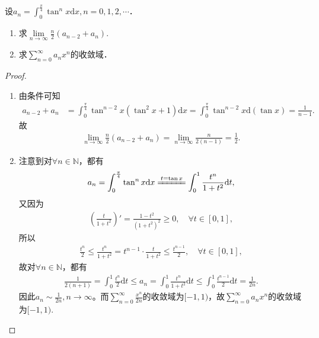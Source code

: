 \documentclass[../../main.tex]{subfiles}
\begin{document}
\begin{example}
设$a_n = \int_0^{\frac{\pi}{4}} \tan^n x \mathrm{d}x, n = 0,1,2,\cdots$．
\begin{enumerate}[(1)]
\item 求$\lim\limits_{n \to \infty} \frac{n}{2}(a_{n-2} + a_n).$

\item 求$\sum\limits_{n=0}^{\infty} a_n x^n$的收敛域．
\end{enumerate}
\end{example}
\begin{proof}
\begin{enumerate}[(1)]
\item 由条件可知
\begin{align*}
a_{n-2} + a_n &= \int_0^{\frac{\pi}{4}} \tan^{n-2}x \left( \tan^2 x + 1 \right) \mathrm{d}x = \int_0^{\frac{\pi}{4}} \tan^{n-2}x \mathrm{d}(\tan x) = \frac{1}{n-1}.
\end{align*}
故
\begin{align*}
\lim_{n \to \infty} \frac{n}{2} \left( a_{n-2} + a_n \right) = \lim_{n \to \infty} \frac{n}{2(n-1)} = \frac{1}{2}.
\end{align*}

\item 注意到对$\forall n\in \mathbb{N}$，都有
\begin{align*}
a_n = \int_0^{\frac{\pi}{4}} \tan^n x \mathrm{d}x \xlongequal{t = \tan x} \int_0^1 \frac{t^n}{1 + t^2} \mathrm{d}t,
\end{align*}
又因为
\begin{align*}
\left( \frac{t}{1 + t^2} \right)' = \frac{1 - t^2}{(1 + t^2)^2} \geqslant 0,\quad \forall t \in [0,1],
\end{align*}
所以
\begin{align*}
\frac{t^n}{2} \leqslant \frac{t^n}{1 + t^2} = t^{n-1} \cdot \frac{t}{1 + t^2} \leqslant \frac{t^{n-1}}{2}, \quad \forall t \in [0,1],
\end{align*}
故对$\forall n\in \mathbb{N}$，都有
\begin{align*}
\frac{1}{2(n+1)} = \int_0^1 \frac{t^n}{2} \mathrm{d}t \leqslant a_n = \int_0^1 \frac{t^n}{1 + t^2} \mathrm{d}t \leqslant \int_0^1 \frac{t^{n-1}}{2} \mathrm{d}t = \frac{1}{2n}.
\end{align*}
因此$a_n \sim \frac{1}{2n}, n \to \infty$。而$\sum_{n=0}^{\infty} \frac{x^n}{2n}$的收敛域为$[-1,1)$，故$\sum_{n=0}^{\infty} a_n x^n$的收敛域为$[-1,1)$.
\end{enumerate}

\end{proof}
\end{document}
